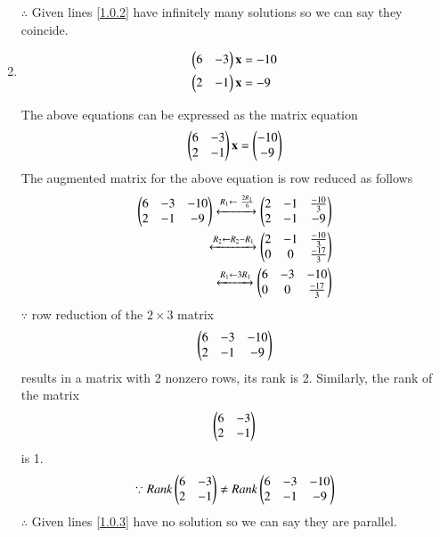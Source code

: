 \documentclass[journal,12pt,twocolumn]{IEEEtran}
\begin{document}
\begin{enumerate}
$\therefore$ Given lines \eqref{1.0.2} have infinitely many solutions so we can say they coincide.


\item
\begin{align}
\begin{split}
\begin{pmatrix}6 & -3 \end{pmatrix}\mathbf{x}&=-10
\\
\begin{pmatrix}2 & -1 \end{pmatrix}\mathbf{x}&=-9
\end{split}
\end{align}

The above equations can be expressed as the matrix equation
\begin{align}
\begin{pmatrix}6 & -3\\2 & -1\end{pmatrix} \mathbf{x} = \begin{pmatrix}-10\\-9\end{pmatrix}
\end{align}
%
The augmented matrix for the above equation is row reduced as follows
\begin{align}
\begin{pmatrix}6 & -3 & -10\\2 & -1 & -9 \end{pmatrix} 
\xleftrightarrow {R_1\leftarrow \ \frac{2R_1}{6}}\begin{pmatrix}2 & -1 & \frac{-10}{3}\\2 & -1 & -9\end{pmatrix} 
\\
\xleftrightarrow {R_2\leftarrow R_2-R_1}\begin{pmatrix}2 & -1 & \frac{-10}{3} \\0 & 0 & \frac{-17}{3} \end{pmatrix}
\\
\xleftrightarrow {R_1\leftarrow 3R_1}\begin{pmatrix}6 & -3 & -10 \\0 & 0 & \frac{-17}{3}\end{pmatrix} 
\\
\end{align}
%
$\because$ row reduction of the $2\times 3$ matrix
%
\begin{align}
\begin{pmatrix}6 & -3 & -10\\2 & -1 & -9\end{pmatrix}
\end{align}
%
results in a matrix with 2 nonzero rows, its rank is 2. 
%
Similarly, the rank of the matrix 
\begin{align}
\begin{pmatrix}6 & -3 \\2 & -1 \end{pmatrix} 
\end{align}
%
is 1.
%
\begin{align}
\because Rank \begin{pmatrix}6 & -3 \\2 & -1 \end{pmatrix} \ne Rank \begin{pmatrix}6 & -3 & -10\\2 & -1 & -9\end{pmatrix}
\end{align}
$\therefore$ Given lines \eqref{1.0.3} have no solution so we can say they are parallel.


\end{enumerate}
\end{document}

